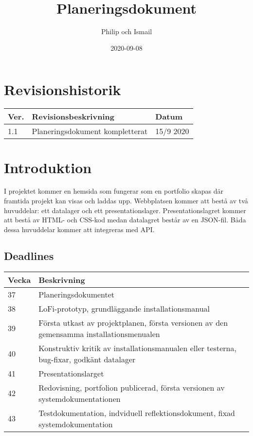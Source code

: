 \documentclass{TDP003mall}
\author{Philip och Ismail}
\title{Planeringsdokument}
\date{2020-09-08}
\begin{document}
\projectpage

\tableofcontents
\newpage

\section{Revisionshistorik}
\begin{table}[!h]
\begin{tabularx}{\linewidth}{|l|X|l|}
\hline
Ver. & Revisionsbeskrivning & Datum \\\hline
1.1 & Planeringsdokument kompletterat & 15/9 2020 \\\hline
\end{tabularx}
\end{table}


\section{Introduktion}
I projektet kommer en hemsida som fungerar som en portfolio skapas där framtida projekt kan visas och laddas upp. Webbplatsen kommer att bestå av två huvuddelar: ett datalager och ett presentationslager. Presentationslagret kommer att bestå av HTML- och CSS-kod medan datalagret består av en JSON-fil. Båda dessa huvuddelar kommer att integreras med API.

\subsection{Deadlines}
\begin{table}[!h]
\begin{tabularx}{\linewidth}{|l|X|}
\hline
Vecka & Beskrivning \\\hline
37 & Planeringsdokumentet \\\hline
38 & LoFi-prototyp, grundläggande installationsmanual \\\hline
39 & Första utkast av projektplanen, första versionen av den gemensamma installationsmenualen \\\hline
40 & Konstruktiv kritik av installationsmanualen eller testerna, bug-fixar, godkänt datalager \\\hline
41 & Presentationslarget \\\hline
42 & Redovisning, portfolion publicerad, första versionen av systemdokumentationen \\\hline
43 & Testdokumentation, indviduell reflektionsdokument, fixad systemdokumentation \\\hline
\end{tabularx}
\end{table}
\end{document}
